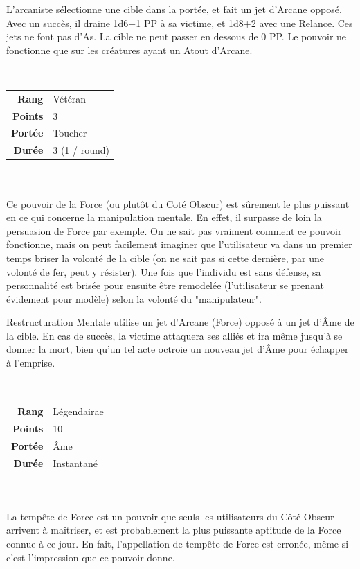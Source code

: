 \begin{description}[align=left]
        L’arcaniste sélectionne une cible dans la portée, et fait un jet d’Arcane opposé. Avec un succès, il draine 1d6+1 PP à sa victime, et 1d8+2 avec une Relance. Ces jets ne font pas d’As. La cible ne peut passer en dessous de 0 PP. Le pouvoir ne fonctionne que sur les créatures ayant un Atout d’Arcane.
        \\

    \item [Restructuration Mentale] ~ \\

        \begin{tabular}{ r l }
            \textbf{Rang}    & Vétéran \\
            \textbf{Points}  & 3 \\
            \textbf{Portée}  & Toucher \\
            \textbf{Durée}   & 3 (1 / round) \\
        \end{tabular}
        \\ \\
        Ce pouvoir de la Force (ou plutôt du Coté Obscur) est sûrement le plus puissant en ce qui concerne la manipulation mentale. En effet, il surpasse de loin la persuasion de Force par exemple. On ne sait pas vraiment comment ce pouvoir fonctionne, mais on peut facilement imaginer que l'utilisateur va dans un premier temps briser la volonté de la cible (on ne sait pas si cette dernière, par une volonté de fer, peut y résister). Une fois que l'individu est sans défense, sa personnalité est brisée pour ensuite être remodelée (l'utilisateur se prenant évidement pour modèle) selon la volonté du "manipulateur". 

        Restructuration Mentale utilise un jet d’Arcane (Force) opposé à un jet d’\^Ame de la cible. En cas de succès, la victime attaquera ses alliés et ira même jusqu’à se donner la mort, bien qu’un tel acte octroie un nouveau jet d’\^Ame pour échapper à l’emprise.
        \\

    \item [Tempête de Force] ~ \\

        \begin{tabular}{ r l }
            \textbf{Rang}    & Légendairae \\
            \textbf{Points}  & 10 \\
            \textbf{Portée}  & \^Ame \\
            \textbf{Durée}   & Instantané \\
        \end{tabular}
        \\ \\
        La tempête de Force est un pouvoir que seuls les utilisateurs du Côté Obscur arrivent à maîtriser, et est probablement la plus puissante aptitude de la Force connue à ce jour. En fait, l'appellation de tempête de Force est erronée, même si c'est l'impression que ce pouvoir donne. 


\end{description}
